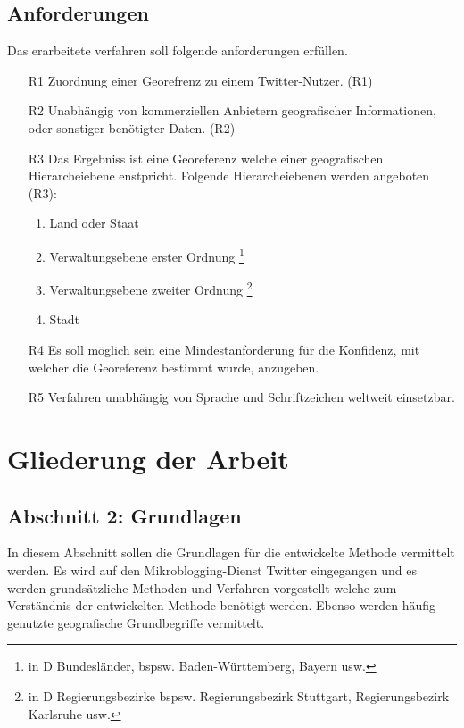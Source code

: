 	\subsection{Anforderungen}\label{sec:Anforderungen}
	Das erarbeitete verfahren soll folgende anforderungen erfüllen.
		\begin{enumerate}
			\item[R1] Zuordnung einer Georefrenz zu einem Twitter-Nutzer. (R1) 
			\item[R2] Unabhängig von kommerziellen Anbietern geografischer Informationen, oder sonstiger benötigter Daten. (R2)
			\item[R3] Das Ergebniss ist eine Georeferenz welche einer geografischen Hierarcheiebene enstpricht. Folgende Hierarcheiebenen werden angeboten (R3): 
			\begin{enumerate}
			 	\item Land oder Staat
			 	\item Verwaltungsebene erster Ordnung \footnote{in D Bundesländer, bspsw. Baden-Württemberg, Bayern usw. }
			 	\item Verwaltungsebene zweiter Ordnung \footnote{in D Regierungsbezirke bspsw. Regierungsbezirk Stuttgart, Regierungsbezirk Karlsruhe usw.}
			 	\item Stadt
			 \end{enumerate} 
			\item[R4] Es soll möglich sein eine Mindestanforderung für die Konfidenz, mit welcher die Georeferenz bestimmt wurde, anzugeben.  
			\item[R5] Verfahren unabhängig von Sprache und Schriftzeichen weltweit einsetzbar.
		\end{enumerate}
		
	\section{Gliederung der Arbeit}

		\subsection*{Abschnitt 2: Grundlagen}
			In diesem Abschnitt sollen die Grundlagen für die entwickelte Methode vermittelt werden. 
			Es wird auf den Mikroblogging-Dienst Twitter eingegangen und es werden grundsätzliche Methoden und Verfahren vorgestellt welche zum Verständnis der entwickelten Methode benötigt werden. 
			Ebenso werden häufig genutzte geografische Grundbegriffe vermittelt.

